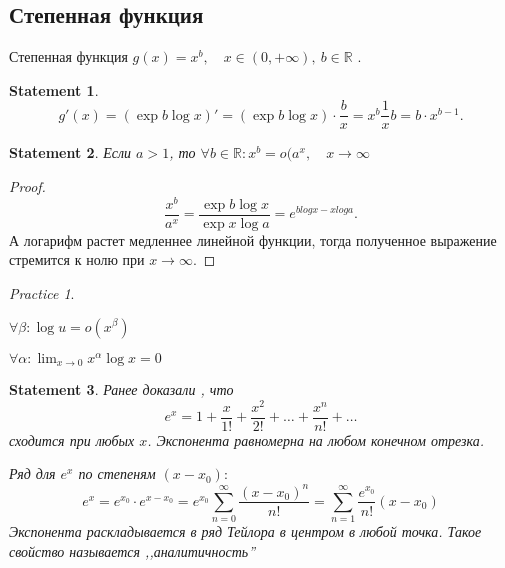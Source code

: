 \documentclass[11pt]{book}
\newcommand{\R}{\mathbb{R}}
\theoremstyle{definition}
\theoremstyle{plain}
\theoremstyle{plain}
\newtheorem*{st}{Statement}
\theoremstyle{definition}
\theoremstyle{remark}
\newtheorem*{prac}{Practice}
\begin{document}
\subsection{Степенная функция}
\begin{defn}
    Степенная функция $ g(x) = x^{b}, \quad x \in  (0, +\infty), ~b \in  \R$ .
\end{defn}
\begin{st}
    \[
	g'(x) = (\exp b \log x) ' = (\exp b \log x)  \cdot  \frac{b}{x} = x^{b} \frac{1}{x} b = b \cdot { x ^{ b-1}}
    .\]
\end{st}
\begin{st}
    Если $ a > 1$, то $ \forall  b \in  \R : x^{ b} = o(a ^{ x}, \quad x \to  \infty$
\end{st}
\begin{proof}
    \[
	\frac{x ^{ b}}{a^{ x}} = \frac{\exp b \log x}{\exp x \log a} = e^{ b log x - x log a}
    .\]
    А логарифм растет медленнее линейной функции, тогда полученное выражение стремится к нолю при $ x \to  \infty$.
\end{proof}
\begin{prac}
    $ $

    $ \forall  \beta :\log u = o(x ^{ \beta }) $

    $ \forall  \alpha :\lim_{x \to  0}  x^{ \alpha } \log x = 0$
\end{prac}
\begin{st}
    Ранее доказали %
    , что  \[
	e ^{ x} = 1 + \frac{x}{1!} + \frac{x^2}{2! } + \ldots + \frac{x^{n}}{n!} + \ldots
    \]  сходится при любых $ x$. Экспонента равномерна на любом конечном отрезка.

    Ряд для $ e^{ x}$ по степеням $ ( x - x_0):$
    \begin{equation}
	e ^{ x} = e^{ x_0} \cdot e ^{x- x_0} = e ^{ x_0} \sum_{n=0}^{\infty} \frac{(x-x_0)^{n}}{n!} = \sum_{n=1} ^{\infty} \frac{e^{x_0}}{n!} (x - x_0)
    \end{equation}
    Экспонента раскладывается в ряд Тейлора в центром в любой точка. Такое свойство называется ,,аналитичность''
\end{st}
\end{document}
